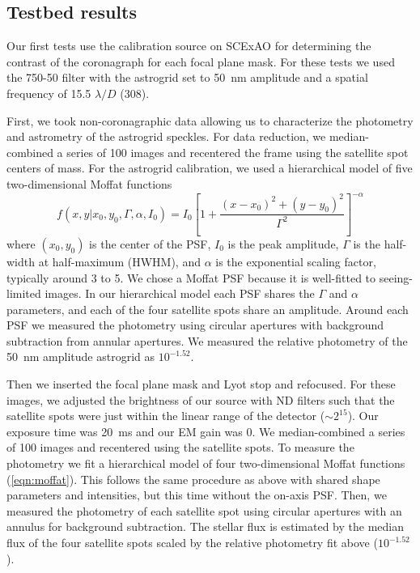 \documentclass[]{spie}  %
\begin{document}
\subsection{Testbed results}\label{sec:testbed}

Our first tests use the calibration source on SCExAO for determining the contrast of the coronagraph for each focal plane mask. For these tests we used the 750-50 filter with the astrogrid set to \qty{50}{\nano\meter} amplitude and a spatial frequency of 15.5 $\lambda/D$ (\qty{308}{\milliarcsecond}).

First, we took non-coronagraphic data allowing us to characterize the photometry and astrometry of the astrogrid speckles. For data reduction, we median-combined a series of 100 images and recentered the frame using the satellite spot centers of mass. For the astrogrid calibration, we used a hierarchical model of five two-dimensional Moffat functions
\begin{equation}
   \label{eqn:moffat}
   f\left( x, y | x_0, y_0, \Gamma, \alpha, I_0\right) = I_0 \left[1 + \frac{\left(x-x_0\right)^2 + \left(y-y_0\right)^2}{\Gamma^2} \right]^{-\alpha}
\end{equation}
where $(x_0, y_0)$ is the center of the PSF, $I_0$ is the peak amplitude, $\Gamma$ is the half-width at half-maximum (HWHM), and $\alpha$ is the exponential scaling factor, typically around 3 to 5. We chose a Moffat PSF because it is well-fitted to seeing-limited images\cite{trujillo2001}. In our hierarchical model each PSF shares the $\Gamma$ and $\alpha$ parameters, and each of the four satellite spots share an amplitude. Around each PSF we measured the photometry using circular apertures with background subtraction from annular apertures. We measured the relative photometry of the \qty{50}{\nano\meter} amplitude astrogrid as $10^{-1.52}$.

Then we inserted the focal plane mask and Lyot stop and refocused. For these images, we adjusted the brightness of our source with ND filters such that the satellite spots were just within the linear range of the detector ($\sim2^{15}$). Our exposure time was \qty{20}{\milli\second} and our EM gain was 0. We median-combined a series of 100 images and recentered using the satellite spots. To measure the photometry we fit a hierarchical model of four two-dimensional Moffat functions (\autoref{eqn:moffat}). This follows the same procedure as above with shared shape parameters and intensities, but this time without the on-axis PSF. Then, we measured the photometry of each satellite spot using circular apertures with an annulus for background subtraction. The stellar flux is estimated by the median flux of the four satellite spots scaled by the relative photometry fit above ($10^{-1.52}$).
\end{document}
